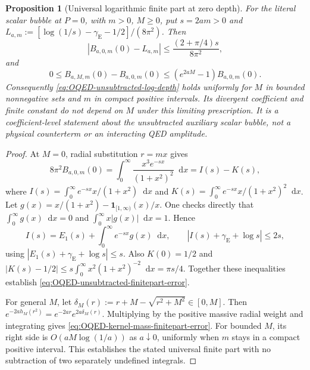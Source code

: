 \documentclass[final,5p,times,twocolumn,numbers,nopreprintline]{elsarticle}
\numberwithin{equation}{section}
\newtheorem{proposition}[theorem]{Proposition}
\theoremstyle{definition}
\theoremstyle{remark}
\newcommand{\dd}{\mathop{}\!\mathrm d}
\begin{document}
\begin{proposition}[Universal logarithmic finite part at zero depth]
\label{prop:OQED-zero-depth-finite-part}
For the literal scalar bubble at $P=0$, with $m>0$, $M\geq0$,
put $s=2am>0$ and
$L_{a,m}:=[\log(1/s)-\gamma_{\mathrm E}-1/2]/(8\pi^2)$.
Then
\begin{equation}
 |B_{a,0,m}(0)-L_{a,m}|
 \leq \frac{(2+\pi/4)s}{8\pi^2},
 \label{eq:OQED-unsubtracted-finitepart-error}
\end{equation}
and
\begin{equation}
 0\leq B_{a,M,m}(0)-B_{a,0,m}(0)
 \leq(e^{2aM}-1)B_{a,0,m}(0).
 \label{eq:OQED-kernel-mass-finitepart-error}
\end{equation}
Consequently \eqref{eq:OQED-unsubtracted-log-depth} holds
uniformly for $M$ in bounded nonnegative sets and $m$ in
compact positive intervals. Its divergent coefficient and
finite constant do not depend on $M$ under this limiting
prescription. It is a coefficient-level statement about the
unsubtracted \emph{auxiliary scalar bubble}, not a physical
counterterm or an interacting QED amplitude.
\end{proposition}
\begin{proof}
At $M=0$, radial substitution $r=mx$ gives
\begin{equation}
 8\pi^2B_{a,0,m}(0)
 =\int_0^\infty\frac{x^3e^{-sx}}{(1+x^2)^2}\dd x
 =I(s)-K(s),
 \label{eq:OQED-massless-kernel-log-integrals}
\end{equation}
where
$I(s)=\int_0^\infty e^{-sx}x/(1+x^2)\dd x$ and
$K(s)=\int_0^\infty e^{-sx}x/(1+x^2)^2\dd x$.
Let
$g(x)=x/(1+x^2)-\mathbf1_{[1,\infty)}(x)/x$.
One checks directly that
$\int_0^\infty g(x)\dd x=0$ and
$\int_0^\infty x|g(x)|\dd x=1$. Hence
\[
 I(s)=E_1(s)+\int_0^\infty e^{-sx}g(x)\dd x,
 \qquad
 |I(s)+\gamma_{\mathrm E}+\log s|\leq2s,
\]
using $|E_1(s)+\gamma_{\mathrm E}+\log s|\leq s$.
Also $K(0)=1/2$ and
$|K(s)-1/2|\leq s\int_0^\infty
 x^2(1+x^2)^{-2}\dd x=\pi s/4$.
Together these inequalities establish
\eqref{eq:OQED-unsubtracted-finitepart-error}.

For general $M$, let
$\delta_M(r):=r+M-\sqrt{r^2+M^2}\in[0,M]$.
Then
$e^{-2ah_M(r^2)}=e^{-2ar}e^{2a\delta_M(r)}$.
Multiplying by the positive massive radial weight and
integrating gives \eqref{eq:OQED-kernel-mass-finitepart-error}.
For bounded $M$, its right side is
$O(aM\log(1/a))$ as $a\downarrow0$, uniformly when
$m$ stays in a compact positive interval. This establishes
the stated universal finite part with no subtraction
of two separately undefined integrals.
\end{proof}
\end{document}

